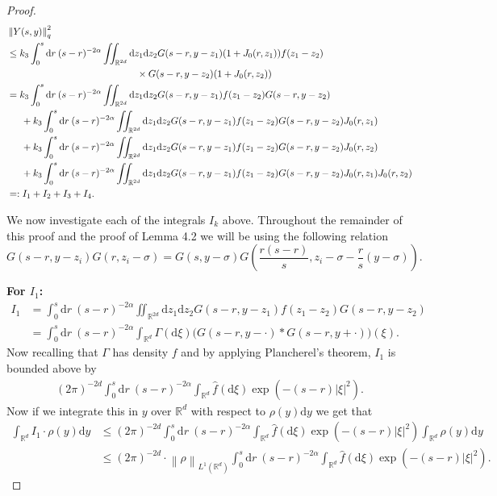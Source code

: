 \documentclass[a4paper,11pt]{article}%
\numberwithin{equation}{section}
\theoremstyle{plain}
\theoremstyle{definition}
\newcommand{\R}{\mathbb{R}}
\newcommand{\Norm}[1]{\left\|  #1   \right\|}
\newcommand{\ud}{\ensuremath{ \mathrm{d} }}
\begin{document}
\begin{proof}
\begin{align*}
&\Norm{Y(s,y)}_q^2\\
&\le k_3 \int_0^s \ud r \: (s-r)^{-2\alpha} \iint_{\R^{2d}} \ud z_1\ud z_2 G(s-r,y-z_1)  (1+J_0(r,z_1)) f(z_1-z_2)\\
&\hspace{13.5em} \times  G(s-r,y-z_2) (1+J_0(r,z_2))
\\ &=  k_3 \int_0^s \ud r \: (s-r)^{-2\alpha} \iint_{\R^{2d}} \ud z_1\ud z_2 G(s-r,y-z_1)f(z_1-z_2)G(s-r,y-z_2)
\\ &\hspace{1.5em}+  k_3 \int_0^s \ud r \: (s-r)^{-2\alpha} \iint_{\R^{2d}} \ud z_1\ud z_2 G(s-r,y-z_1)f(z_1-z_2)G(s-r,y-z_2)J_0(r,z_1)
\\ &\hspace{1.5em}+  k_3 \int_0^s \ud r \: (s-r)^{-2\alpha} \iint_{\R^{2d}} \ud z_1\ud z_2 G(s-r,y-z_1)f(z_1-z_2)G(s-r,y-z_2)J_0(r,z_2)
\\ &\hspace{1.5em}+  k_3 \int_0^s \ud r \: (s-r)^{-2\alpha} \iint_{\R^{2d}} \ud z_1\ud z_2 G(s-r,y-z_1)f(z_1-z_2)G(s-r,y-z_2)J_0(r,z_1)J_0(r,z_2)\\
   &=: I_1 +I_2+I_3+I_4.
\end{align*}

We now investigate each of the integrals $I_k$ above. Throughout the remainder of this proof and the proof of Lemma 4.2 we will be using the following relation
\begin{equation}
	\label{E:gsim}
	G(s-r,y-z_i)G(r,z_i-\sigma)=G(s,y-\sigma)G\left(\dfrac{r(s-r)}{s},z_i-\sigma-\dfrac{r}{s}(y-\sigma)\right) .
\end{equation}

\noindent \textbf{For $I_1$:}
\begin{align*}
	I_1 & = \int_0^s \ud r \: (s-r)^{-2\alpha} \iint_{\R^{2d}} \ud z_1\ud z_2 G(s-r,y-z_1)f(z_1-z_2)G(s-r,y-z_2)
	\\  & = \int_0^s \ud r \: (s-r)^{-2\alpha} \int_{\R^{d}} \Gamma(\ud \xi) \big(G(s-r,y-\cdot)*G(s-r,y+\cdot)\big)(\xi).
\end{align*}
Now recalling that $\Gamma$ has density $f$ and by applying Plancherel's theorem, $I_1$ is bounded above by
\begin{align*}
	(2\pi)^{-2d}\int_0^s \ud r \: (s-r)^{-2\alpha} \int_{\R^{d}} \hat f(\ud \xi) \exp\left(-(s-r)|\xi|^2 \right).
\end{align*}
Now if we integrate this in $y$ over $\R^d$ with respect to $\rho(y)\ud y$ we get that
\begin{align*}
	\int_{\R^d}I_1\cdot \rho(y)\ud y &\le (2\pi)^{-2d} \int_0^s \ud r \: (s-r)^{-2\alpha} \int_{\R^{d}} \hat f(\ud \xi) \exp\left(-(s-r)|\xi|^2 \right)  \int_{\R^d}\rho(y)\ud y
\\ &\le (2\pi)^{-2d}\cdot \Norm{\rho}_{L^1(\R^d)} \int_0^s \ud r \: (s-r)^{-2\alpha} \int_{\R^{d}} \hat f(\ud \xi) \exp\left(-(s-r)|\xi|^2 \right) .
\end{align*}



\end{proof}
\end{document}
